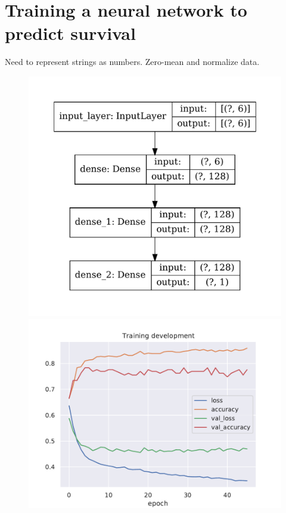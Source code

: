 \documentclass{book}
\begin{document}
\section*{Training a neural network to predict survival}
Need to represent strings as numbers.
Zero-mean and normalize data.
\begin{figure}[h]
    \centering
    \includegraphics[scale=.4]{../figs/model.pdf}
    \includegraphics[scale=.65]{../figs/training_development.pdf}
\end{figure}
\end{document}
